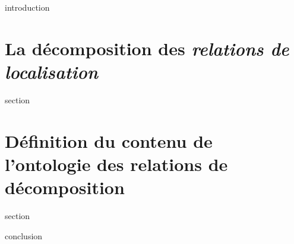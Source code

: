 

\chaptertoc{}

\label{sec:5-int}
{introduction}

\section{La décomposition des \emph{relations de localisation}}
\label{sec:5-1}
{section}

\section{Définition du contenu de l'ontologie des relations de
  décomposition}
\label{sec:5-2}
{section}

\label{sec:5-cnc}
{conclusion}


